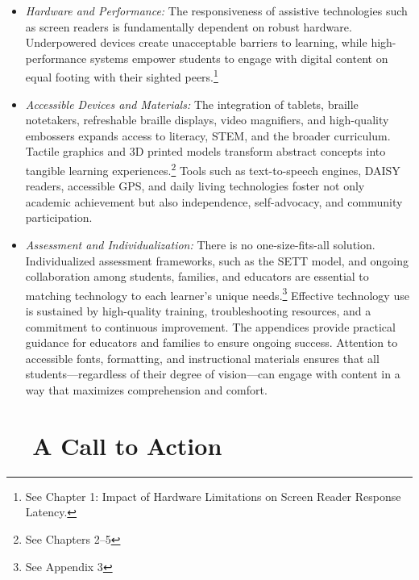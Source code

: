 \begin{itemize}
	\item \emph{Hardware and Performance:} The responsiveness of assistive technologies such as screen readers is fundamentally dependent on robust hardware. Underpowered devices create unacceptable barriers to learning, while high-performance systems empower students to engage with digital content on equal footing with their sighted peers.\footnote{See Chapter 1: Impact of Hardware Limitations on Screen Reader Response Latency.}
	\item \emph{Accessible Devices and Materials:} The integration of tablets, braille notetakers, refreshable braille displays, video magnifiers, and high-quality embossers expands access to literacy, STEM, and the broader curriculum. Tactile graphics and 3D printed models transform abstract concepts into tangible learning experiences.\footnote{See Chapters 2–5}
	      Tools such as text-to-speech engines, DAISY readers, accessible GPS, and daily living technologies foster not only academic achievement but also independence, self-advocacy, and community participation. \cite{Chapters6to8}
	\item \emph{Assessment and Individualization:} There is no one-size-fits-all solution. Individualized assessment frameworks, such as the SETT model, and ongoing collaboration among students, families, and educators are essential to matching technology to each learner's unique needs.\footnote{See Appendix 3}
	      Effective technology use is sustained by high-quality training, troubleshooting resources, and a commitment to continuous improvement. The appendices provide practical guidance for educators and families to ensure ongoing success. \cite{Appendices1to4}
	      Attention to accessible fonts, formatting, and instructional materials ensures that all students—regardless of their degree of vision—can engage with content in a way that maximizes comprehension and comfort. \cite{Appendix5}
\end{itemize}

\section{~~A Call to Action}
\label{sec:conclusion-call-to-action}


